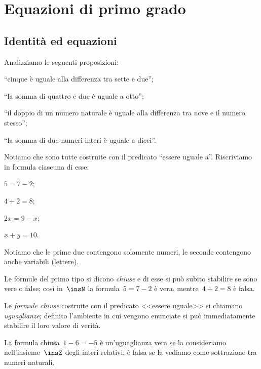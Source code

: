 \chapter{Equazioni di primo grado}
\section{Identità ed equazioni}

Analizziamo le seguenti proposizioni:

\begin{enumeratea}
\item ``cinque è uguale alla differenza tra sette e due'';
\item ``la somma di quattro e due è uguale a otto'';
\item ``il doppio di un numero naturale è uguale alla differenza tra nove e il numero stesso'';
\item ``la somma di due numeri interi è uguale a dieci''.
\end{enumeratea}

Notiamo che sono tutte costruite con il predicato
``essere uguale a''. Riscriviamo in formula ciascuna di esse:
\begin{multicols}{4}
 \begin{enumeratea}
\item $5=7-2$;
\item $4+2=8$;
\item $2x=9-x$;
\item $x+y=10$.
\end{enumeratea}
\end{multicols}
Notiamo che le prime due contengono solamente numeri, le seconde
contengono anche variabili (lettere).

Le formule del primo tipo si dicono \emph{chiuse} e
di esse si può subito stabilire se sono vere o false; così in~$\insN$ la
formula~$5 = 7 - 2$ è vera, mentre~$4 + 2 = 8$ è falsa.

\begin{definizione}
 Le \emph{formule chiuse} costruite con il predicato
<<essere uguale>> si chiamano \emph{uguaglianze};
definito l'ambiente in cui vengono enunciate si può
immediatamente stabilire il loro valore di verità.
\end{definizione}

\begin{exrig}
 \begin{esempio}
 La formula chiusa~$1 - 6 = -5$ è un'uguaglianza
vera se la consideriamo nell'insieme~$\insZ$ degli interi
relativi, è falsa se la vediamo come sottrazione tra numeri naturali.
 \end{esempio}
\end{exrig}

